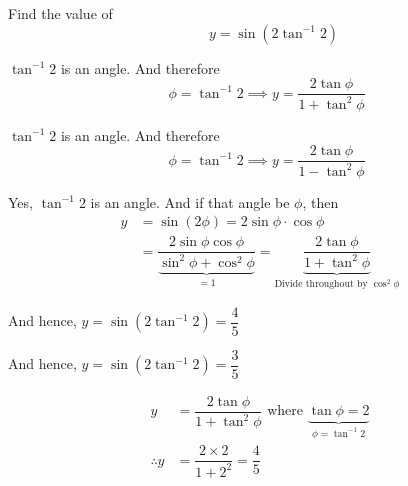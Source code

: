 \documentclass[14pt,fleqn]{extarticle}
\begin{document}
 
\begin{question}
	\statement 
    
    Find the value of 
    \[ \qquad y = \sin \left(2\tan^{-1}2 \right)\]
          
    \begin{step}
  \begin{options} 
     \correct 
     
       $\tan^{-1}2$ is an angle. And therefore 
       \[ \quad \phi = \tan^{-1} 2\implies y = \dfrac{2\tan\phi}{1+\tan^2\phi}\]

     \incorrect
        
        $\tan^{-1}2$ is an angle. And therefore 
       \[ \quad \phi = \tan^{-1} 2\implies y = \dfrac{2\tan\phi}{1-\tan^2\phi}\]
    \end{options} 
     \reason 
     
     Yes, $\tan^{-1} 2$ is an angle. And if that angle be $\phi$, then 
     \begin{align}
	y &= \sin \left(2\phi \right) = 2\sin\phi\cdot\cos\phi \\
	&= \dfrac{2\sin\phi\cos\phi}{\underbrace{\sin^2\phi + \cos^2\phi}_{=1}} = \underbrace{\dfrac{2\tan\phi}{1+\tan^2\phi}}_{\text{Divide throughout by }\cos^2\phi}
\end{align}
       
\end{step}

\begin{step}
  \begin{options} 
     \correct 
       
     And hence, $y = \sin \left(2\tan^{-1} 2 \right) = \dfrac{4}{5}$ 
     \incorrect
     
     And hence, $y = \sin \left(2\tan^{-1} 2 \right) = \dfrac{3}{5}$ 
        
    \end{options} 
     \reason 
     
     \begin{align}
     y &= \dfrac{2\tan\phi}{1+\tan^2\phi} \text{ where } \underbrace{\tan\phi = 2}_{\phi = \tan^{-1} 2} \\
     \therefore y &= \dfrac{2\times 2}{1+2^2} = \dfrac{4}{5}  
\end{align}
     
     
       
\end{step}
\end{question} 
\end{document}
